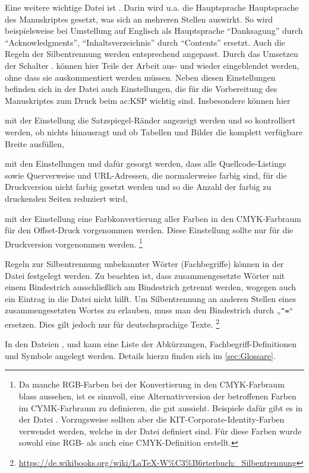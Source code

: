 Eine weitere wichtige Datei ist .
Darin wird u.a. die Hauptsprache Hauptsprache des Manuskriptes gesetzt, was sich an mehreren Stellen auswirkt.
So wird beispielsweise bei Umstellung auf Englisch als Hauptsprache
\enquote{Danksagung} durch \enquote{Acknowledgments},
\enquote{Inhaltsverzeichnis} durch \enquote{Contents}
\usw ersetzt.
Auch die Regeln der Silbentrennung werden entsprechend angepasst.
Durch das Umsetzen der Schalter  \bzw.  können hier Teile der Arbeit aus- und wieder eingeblendet werden, ohne dass sie auskommentiert werden müssen.
Neben diesen Einstellungen befinden sich in der Datei  auch Einstellungen,
die für die Vorbereitung des Manuskriptes zum Druck beim \gls{ac:KSP} wichtig sind.
Insbesondere können hier
\begin{itemize*}
\item mit der Einstellung 
die Satzspiegel-Ränder angezeigt werden und so kontrolliert werden,
ob nichts hinausragt und ob Tabellen und Bilder die komplett verfügbare Breite ausfüllen,
\item mit den Einstellungen  und 
dafür gesorgt werden, dass alle Quellcode-Listings sowie Querverweise und URL-Adressen,
die normalerweise farbig sind, für die Druckversion nicht farbig gesetzt werden
und so die Anzahl der farbig zu druckenden Seiten reduziert wird,
\item mit der Einstellung  eine Farbkonvertierung
aller Farben in den CMYK-Farbraum für den Offset-Druck vorgenommen werden.
Diese Einstellung sollte nur für die Druckversion vorgenommen werden.%
\footnote{Da manche RGB-Farben bei der Konvertierung in den CMYK-Farbraum blass aussehen,
ist es sinnvoll, eine Alternativversion der betroffenen Farben im CYMK-Farbraum zu definieren,
die gut aussieht.
Beispiele dafür gibt es in der Datei .
Vorzugsweise sollten aber die KIT-Corporate-Identity-Farben verwendet werden,
welche in der Datei  definiert sind.
Für diese Farben wurde sowohl eine RGB- als auch eine CMYK-Definition erstellt.}
\end{itemize*}

Regeln zur Silbentrennung unbekannter Wörter (\zB Fachbegriffe)
können in der Datei  festgelegt werden.
Zu beachten ist, dass zusammengesetzte Wörter mit einem Bindestrich
ausschließlich am Bindestrich getrennt werden,
wogegen auch ein Eintrag in die Datei  nicht hilft.
Um Silbentrennung an anderen Stellen eines zusammengesetzten Wortes zu erlauben,
muss man den Bindestrich durch „\verb+"=+“ ersetzen. Dies gilt jedoch nur für deutschsprachige Texte.%
\footnote{\url{https://de.wikibooks.org/wiki/LaTeX-W%C3%B6rterbuch:_Silbentrennung}}

In den Dateien
,
 und
kann eine Liste der Abkürzungen, Fachbegriff-Definitionen und Symbole angelegt werden.
Details hierzu finden sich im \cref{sec:Glossare}.
